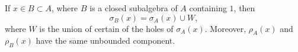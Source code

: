 If $x \in B \subset A$, where $B$ is a closed subalgebra of $A$ containing $1$, then
$$\sigma_B(x) = \sigma_A(x) \cup W,$$
where $W$ is the union of certain of the holes of $\sigma_A(x)$. Moreover, $\rho_A(x)$ and $\rho_B(x)$ have the same unbounded component.
